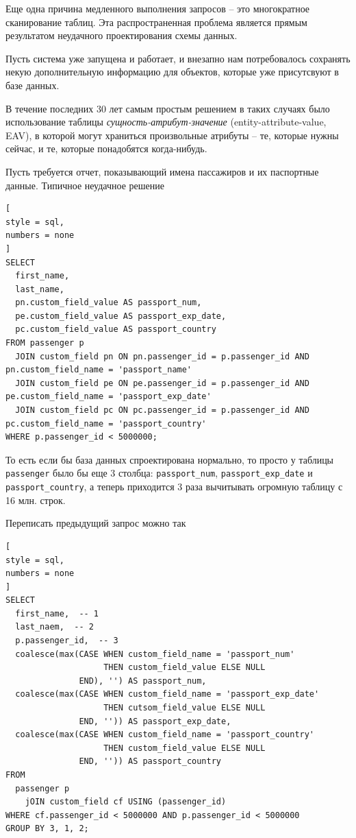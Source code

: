 \documentclass[%
	11pt,
	a4paper,
	utf8,
		]{article}
\begin{document}
Еще одна причина медленного выполнения запросов -- это многократное сканирование таблиц. Эта распространенная проблема является прямым результатом неудачного проектирования схемы данных.

Пусть система уже запущена и работает, и внезапно нам потребовалось сохранять некую дополнительную информацию для объектов, которые уже присутсвуют в базе данных. 

В течение последних 30 лет самым простым решением в таких случаях было использование таблицы \emph{сущность-атрибут-значение} (entity-attribute-value, EAV), в которой могут храниться произвольные атрибуты -- те, которые нужны сейчас, и те, которые понадобятся когда-нибудь.

Пусть требуется отчет, показывающий имена пассажиров и их паспортные данные. Типичное неудачное решение
\begin{lstlisting}[
style = sql,
numbers = none
]
SELECT
  first_name,
  last_name,
  pn.custom_field_value AS passport_num,
  pe.custom_field_value AS passport_exp_date,
  pc.custom_field_value AS passport_country
FROM passenger p
  JOIN custom_field pn ON pn.passenger_id = p.passenger_id AND pn.custom_field_name = 'passport_name'
  JOIN custom_field pe ON pe.passenger_id = p.passenger_id AND pe.custom_field_name = 'passport_exp_date'
  JOIN custom_field pc ON pc.passenger_id = p.passenger_id AND pc.custom_field_name = 'passport_country'
WHERE p.passenger_id < 5000000;
\end{lstlisting}

То есть если бы база данных спроектирована нормально, то просто у таблицы \verb|passenger| было бы еще 3 столбца: \verb|passport_num|, \verb|passport_exp_date| и \verb|passport_country|, а теперь приходится 3 раза вычитывать огромную таблицу с 16 млн. строк.

Переписать предыдущий запрос можно так
\begin{lstlisting}[
style = sql,
numbers = none
]
SELECT
  first_name,  -- 1
  last_naem,  -- 2
  p.passenger_id,  -- 3
  coalesce(max(CASE WHEN custom_field_name = 'passport_num'
                    THEN custom_field_value ELSE NULL
               END), '') AS passport_num,
  coalesce(max(CASE WHEN custom_field_name = 'passport_exp_date'
                    THEN cutsom_field_value ELSE NULL
               END, '')) AS passport_exp_date,
  coalesce(max(CASE WHEN custom_field_name = 'passport_country'
                    THEN custom_field_value ELSE NULL
               END, '')) AS passport_country
FROM
  passenger p 
    jOIN custom_field cf USING (passenger_id)
WHERE cf.passenger_id < 5000000 AND p.passenger_id < 5000000
GROUP BY 3, 1, 2;
\end{lstlisting}
\end{document}
